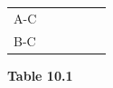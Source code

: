 {\begin{center}
\begin{xtabular*}{\mytablewidth}[t]{|p{10\mystarwidth}|p{10\mystarwidth}|p{10\mystarwidth}|p{10\mystarwidth}|p{10\mystarwidth}|p{10\mystarwidth}|}
        A-C &
         &
         &
         &
         &
     \tabularnewline{}
        B-C &
         &
         &
         &
         &
     \tabularnewline{}
    \end{xtabular*}
      \end{center}
    \begin{center}{\small\bfseries Table 10.1}\end{center}
        }%
